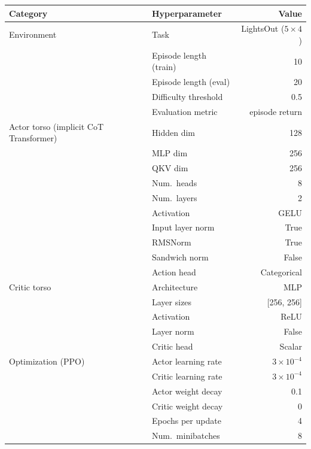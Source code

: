 
\begin{table}[t]
\centering
\begin{tabular}{llr}
\toprule
Category & Hyperparameter & Value \\
\midrule
Environment
  & Task & LightsOut ($5\times4$) \\
  & Episode length (train) & 10 \\
  & Episode length (eval) & 20 \\
  & Difficulty threshold & 0.5 \\
  & Evaluation metric & episode return \\
\midrule
Actor torso (implicit CoT Transformer)
  & Hidden dim & 128 \\
  & MLP dim & 256 \\
  & QKV dim & 256 \\
  & Num.\ heads & 8 \\
  & Num.\ layers & 2 \\
  & Activation & GELU \\
  & Input layer norm & True \\
  & RMSNorm & True \\
  & Sandwich norm & False \\
  & Action head & Categorical \\
\midrule
Critic torso
  & Architecture & MLP \\
  & Layer sizes & [256, 256] \\
  & Activation & ReLU \\
  & Layer norm & False \\
  & Critic head & Scalar \\
\midrule
Optimization (PPO)
  & Actor learning rate & $3\times10^{-4}$ \\
  & Critic learning rate & $3\times10^{-4}$ \\
  & Actor weight decay & 0.1 \\
  & Critic weight decay & 0 \\
  & Epochs per update & 4 \\
  & Num.\ minibatches & 8 \\

\end{tabular}
\end{table}
